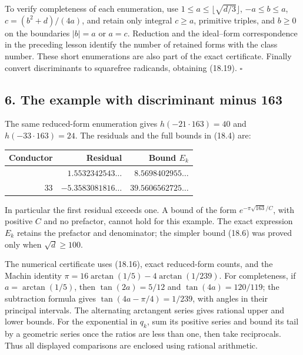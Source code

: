 \documentclass[
  11pt,
  a4paper,
]{article}
\newcounter{none} %
\begin{document}
To verify completeness of each enumeration, use
\(1\le a\le\lfloor\sqrt{d/3}\rfloor\), \(-a\le b\le a\),
\(c=(b^2+d)/(4a)\), and retain only integral \(c\ge a\), primitive
triples, and \(b\ge0\) on the boundaries \(|b|=a\) or \(a=c\). Reduction
and the ideal--form correspondence in the preceding lesson identify the
number of retained forms with the class number. These short enumerations
are also part of the exact certificate. Finally convert discriminants to
squarefree radicands, obtaining (18.19). \(\square\)

\subsection{6. The example with discriminant minus
163}\label{the-example-with-discriminant-minus-163}

The same reduced-form enumeration gives \(h(-21\cdot163)=40\) and
\(h(-33\cdot163)=24\). The residuals and the full bounds in (18.4) are:

{\def\LTcaptype{none} %
\begin{longtable}[]{@{}rrr@{}}
\toprule\noalign{}
Conductor & Residual & Bound \(E_k\) \\
\midrule\noalign{}
\endhead
\bottomrule\noalign{}
\endlastfoot
21 & \(1.5532342543\ldots\) & \(8.5698402955\ldots\) \\
33 & \(-5.3583081816\ldots\) & \(39.5606562725\ldots\) \\
\end{longtable}
}

In particular the first residual exceeds one. A bound of the form
\(e^{-\pi\sqrt{163}/C}\), with positive \(C\) and no prefactor, cannot
hold for this example. The exact expression \(E_k\) retains the
prefactor and denominator; the simpler bound (18.6) was proved only when
\(\sqrt d\ge100\).

The numerical certificate uses (18.16), exact reduced-form counts, and
the Machin identity \(\pi=16\arctan(1/5)-4\arctan(1/239)\). For
completeness, if \(a=\arctan(1/5)\), then \(\tan(2a)=5/12\) and
\(\tan(4a)=120/119\); the subtraction formula gives
\(\tan(4a-\pi/4)=1/239\), with angles in their principal intervals. The
alternating arctangent series gives rational upper and lower bounds. For
the exponential in \(q_k\), sum its positive series and bound its tail
by a geometric series once the ratios are less than one, then take
reciprocals. Thus all displayed comparisons are enclosed using rational
arithmetic.
\end{document}
